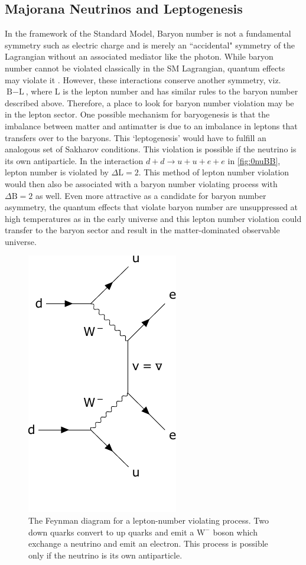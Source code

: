 \subsection{Majorana Neutrinos and Leptogenesis}
In the framework of the Standard Model, Baryon number is not a fundamental symmetry such as electric charge and is merely an ``accidental" symmetry of the Lagrangian without an associated mediator like the photon. While baryon number cannot be violated classically in the SM Lagrangian, quantum effects may violate it \cite{PhysRevLett.37.8}. However, these interactions conserve another symmetry, viz. $\textrm{B}-\textrm{L}$, where L is the lepton number and has similar rules to the baryon number described above. Therefore, a place to look for baryon number violation may be in the lepton sector. One possible mechanism for baryogenesis is that the imbalance between matter and antimatter is due to an imbalance in leptons that transfers over to the baryons. This `leptogenesis' would have to fulfill an analogous set of Sakharov conditions. This violation is possible if the neutrino is its own antiparticle. In the interaction $d + d \rightarrow u + u + e + e$ in \autoref{fig:0nuBB}, lepton number is violated by $\Delta\textrm{L}=2$. This method of lepton number violation would then also be associated with a baryon number violating process with $\Delta\textrm{B}=2$ as well. Even more attractive as a candidate for baryon number asymmetry, the quantum effects that violate baryon number are unsuppressed at high temperatures as in the early universe and this lepton number violation could transfer to the baryon sector and result in the matter-dominated observable universe.

\begin{figure}[tbph]
\centering
\includegraphics[width=0.35\linewidth]{Figures/0NuBB_clip.pdf}
\caption[The Feynman diagram for a lepton-number violating process.]{The Feynman diagram for a lepton-number violating process. Two down quarks convert to up quarks and emit a $\textrm{W}^{-}$ boson which exchange a neutrino and emit an electron. This process is possible only if the neutrino is its own antiparticle.}
\label{fig:0nuBB}
\end{figure}
